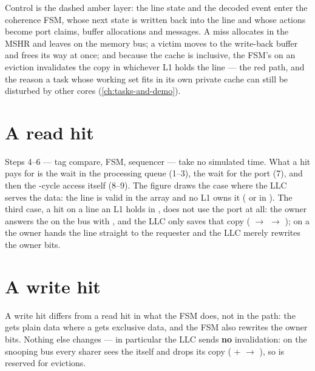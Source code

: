 Control is the dashed amber layer: the line state and the decoded event enter the coherence
FSM, whose next state is written back into the line and whose actions become port claims,
buffer allocations and messages. A miss allocates in the MSHR and leaves on the memory bus; a
victim moves to the write-back buffer and frees its way at once; and because the cache is
inclusive, the FSM's  on an eviction invalidates the copy in whichever L1 holds the
line --- the red path, and the reason a task whose working set fits in its own private cache can
still be disturbed by other cores (\cref{ch:tasks-and-demo}).

\section{A read hit}


Steps 4--6 --- tag compare, FSM, sequencer --- take no simulated time. What a hit pays for is the
wait in the processing queue (1--3), the wait for the port (7), and then the -cycle
access itself (8--9). The figure draws the case where the LLC serves the data: the line is valid
in the array and no L1 owns it ( or  in ). The third case,
a hit on a line an L1 holds in , does not use the port at all: the owner answers the
 on the bus with , and the LLC only saves that copy
( $\rightarrow$  $\rightarrow$ ); on a  the owner
hands the line straight to the requester and the LLC merely rewrites the owner bits.

\section{A write hit}


A write hit differs from a read hit in what the FSM does, not in the path: the  gets
plain data where a  gets exclusive data, and the FSM also rewrites the owner bits.
Nothing else changes --- in particular the LLC sends \textbf{no} invalidation: on the snooping
bus every sharer sees the  itself and drops its copy
( +  $\rightarrow$ ), so  is reserved for
evictions.

